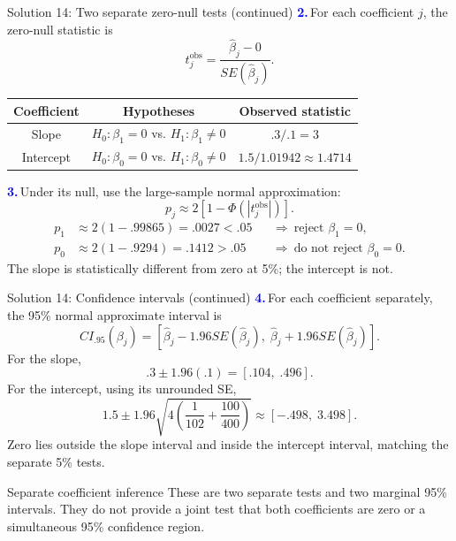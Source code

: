 \documentclass[notes,10pt, aspectratio=169]{beamer}
\newcommand{\answerpart}[1]{\textcolor{blue}{\textbf{#1.}}\,}
\begin{document}
\begin{frame}{Solution 14: Two separate zero-null tests (continued)}
\small
\answerpart{2}For each coefficient $j$, the zero-null statistic is
\[
t_j^{\mathrm{obs}}=\frac{\widehat\beta_j-0}{SE(\widehat\beta_j)}.
\]
\begin{center}
\begin{tabular}{c|c|c}
Coefficient & Hypotheses & Observed statistic\\ \hline
Slope & $H_0:\beta_1=0$ vs. $H_1:\beta_1\ne0$ & $.3/.1=\boxed3$\\[7pt]
Intercept & $H_0:\beta_0=0$ vs. $H_1:\beta_0\ne0$ & $1.5/1.01942\approx\boxed{1.4714}$
\end{tabular}
\end{center}
\answerpart{3}Under its null, use the large-sample normal approximation:
\[
p_j\approx2[1-\Phi(|t_j^{\mathrm{obs}}|)].
\]
\begin{align*}
p_1&\approx2(1-.99865)=\boxed{.0027}<.05
&&\Longrightarrow\ \text{reject }\beta_1=0,\\[4pt]
p_0&\approx2(1-.9294)=\boxed{.1412}>.05
&&\Longrightarrow\ \text{do not reject }\beta_0=0.
\end{align*}
The slope is statistically different from zero at 5\%; the intercept is not.
\end{frame}

\begin{frame}{Solution 14: Confidence intervals (continued)}
\small
\answerpart{4}For each coefficient separately, the 95\% normal approximate interval is
\[
CI_{.95}(\beta_j)
=[\widehat\beta_j-1.96SE(\widehat\beta_j),\;
\widehat\beta_j+1.96SE(\widehat\beta_j)].
\]
For the slope,
\[
.3\pm1.96(.1)=\boxed{[.104,\;.496]}.
\]
For the intercept, using its unrounded SE,
\[
1.5\pm1.96\sqrt{4\left(\frac1{102}+\frac{100}{400}\right)}
\approx\boxed{[-.498,\;3.498]}.
\]
Zero lies outside the slope interval and inside the intercept interval, matching the separate 5\% tests.
\begin{block}{Separate coefficient inference}
These are two separate tests and two marginal 95\% intervals. They do not provide a joint test that both coefficients are zero or a simultaneous 95\% confidence region.
\end{block}
\end{frame}
\fi
\end{document}
